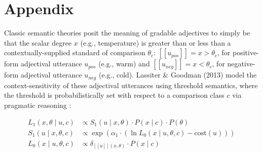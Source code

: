 \documentclass[doc]{apa6}
\begin{document}





\newpage
\section{Appendix}


Classic semantic theories posit the meaning of gradable adjectives to simply be that the scalar degree $x$ (e.g., temperature) is greater than or less than a contextually-supplied standard of comparison  \(\theta_c\): \([\![u_{pos}]\!] = x > \theta_c\), for positive-form adjectival utterance \(u_{pos}\) (e.g., warm) and \([\![u_{neg}]\!] = x < \theta_c\), for negative-form adjectival utterance \(u_{neg}\) (e.g., cold).
 Lassiter \& Goodman (2013) model the context-sensitivity of these adjectival utterances using threshold semantics, where
the threshold is probabilistically set with respect to a comparison class \(c\) via pragmatic reasoning :

\begin{align}
L_{1}(x, \theta \mid u, c) &\propto S_{1}(u \mid x, \theta) \cdot P(x \mid c) \cdot P(\theta) \label{eq:L1} \\
S_{1}(u \mid x, \theta, c) &\propto \exp{(\alpha_1 \cdot (\ln {L_{0}(x \mid u, \theta, c)} - \text{cost}(u)))} \label{eq:S1}\\
L_{0}(x \mid u, \theta, c) &\propto {\delta_{[\![u]\!](x, \theta)} \cdot P(x \mid c)} \label{eq:L0}
\end{align}
\end{document}
